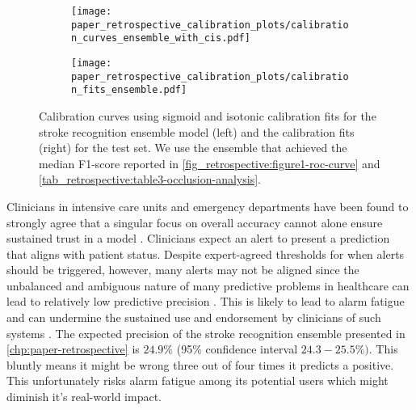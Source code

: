 \begin{figure}
    \begin{subfigure}[c]{0.48\columnwidth}
        \centering
        \texttt{[image: paper\_retrospective\_calibration\_plots/calibration\_curves\_ensemble\_with\_cis.pdf]}
    \end{subfigure}    
    \begin{subfigure}[c]{0.48\columnwidth}
        \centering
        \texttt{[image: paper\_retrospective\_calibration\_plots/calibration\_fits\_ensemble.pdf]}
    \end{subfigure}    
    \caption[Calibration fits and curves for the stroke recognition ensemble using Platt-scaling and isotonic regression for calibration.]{ Calibration curves using sigmoid and isotonic calibration fits for the stroke recognition ensemble model (left) and the calibration fits (right) for the test set. We use the ensemble that achieved the median F1-score reported in \cref{fig_retrospective:figure1-roc-curve} and \cref{tab_retrospective:table3-occlusion-analysis}.}
    \label{fig_discussion:retrospective-paper-calibration-curve-sigmoid-isotonic}
\end{figure}    

Clinicians in intensive care units and emergency departments have been found to strongly agree that a singular focus on overall accuracy cannot alone ensure sustained trust in a model \cite{tonekaboni_what_2019}. Clinicians expect an alert to present a prediction that aligns with patient status. Despite expert-agreed thresholds for when alerts should be triggered, however, many alerts may not be aligned since the unbalanced and ambiguous nature of many predictive problems in healthcare can lead to relatively low predictive precision \parencite{umscheid_development_2015, cite14, cite15, wenstrup_retrospective_2023}. This is likely to lead to alarm fatigue \parencite{embi_evaluating_2012} and can undermine the sustained use and endorsement by clinicians of such systems \parencite{guidi_clinician_2015}. 
The expected precision of the stroke recognition ensemble presented in \cref{chp:paper-retrospective} is $24.9\%$ (95\% confidence interval $24.3-25.5\%)$. This bluntly means it might be wrong three out of four times it predicts a positive. This unfortunately risks alarm fatigue among its potential users which might diminish it's real-world impact.

